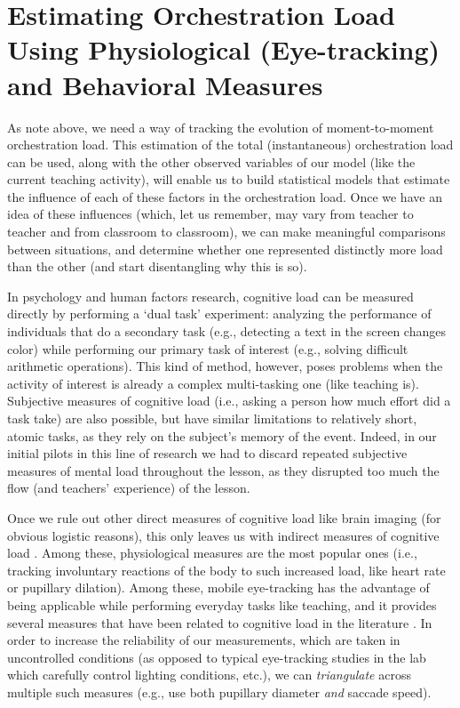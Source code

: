 \documentclass[10pt,journal,compsoc]{IEEEtran}
\begin{document}
\section{Estimating Orchestration Load Using Physiological (Eye-tracking) and Behavioral Measures}
\label{sec:measures}
As note above, we need a way of tracking the evolution of moment-to-moment orchestration load. This estimation of the total (instantaneous) orchestration load can be used, along with the other observed variables of our model (like the current teaching activity), will enable us to build statistical models that estimate the influence of each of these factors in the orchestration load. Once we have an idea of these influences (which, let us remember, may vary from teacher to teacher and from classroom to classroom), we can make meaningful comparisons between situations, and determine whether one represented distinctly more load than the other (and start disentangling why this is so).

In psychology and human factors research, cognitive load can be measured directly by performing a `dual task' experiment: analyzing the performance of individuals that do a secondary task (e.g., detecting a text in the screen changes color) while performing our primary task of interest (e.g., solving difficult arithmetic operations). This kind of method, however, poses problems when the activity of interest is already a complex multi-tasking one \cite{Paas2003} (like teaching is). Subjective measures of cognitive load (i.e., asking a person how much effort did a task take) are also possible, but have similar limitations to relatively short, atomic tasks, as they rely on the subject's memory of the event. Indeed, in our initial pilots in this line of research we had to discard repeated subjective measures of mental load throughout the lesson, as they disrupted too much the flow (and teachers' experience) of the lesson.

Once we rule out other direct measures of cognitive load like brain imaging (for obvious logistic reasons), this only leaves us with indirect measures of cognitive load \cite{Brunken2003}. Among these, physiological measures are the most popular ones (i.e., tracking involuntary reactions of the body to such increased load, like heart rate or pupillary dilation). Among these, mobile eye-tracking has the advantage of being applicable while performing everyday tasks like teaching, and it provides several measures that have been related to cognitive load in the literature \cite{boucsein2000engineering,Buettner2013}. In order to increase the reliability of our measurements, which are taken in uncontrolled conditions (as opposed to typical eye-tracking studies in the lab which carefully control lighting conditions, etc.), we can \textit{triangulate} across multiple such measures (e.g., use both pupillary diameter \textit{and} saccade speed).
\end{document}
